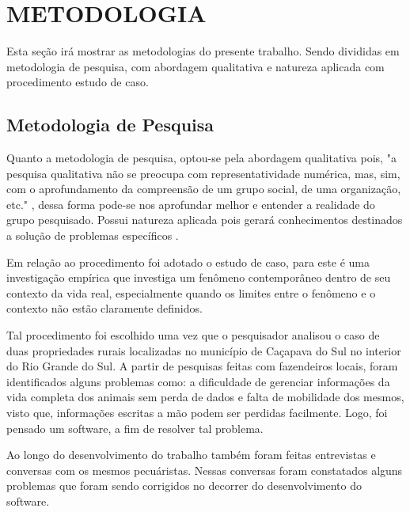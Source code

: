 %
%



\section{METODOLOGIA}\label{chap:metodologia}

Esta seção irá mostrar as metodologias do presente trabalho. Sendo divididas em metodologia de pesquisa, com abordagem qualitativa e natureza aplicada com procedimento estudo de caso.

\subsection{\textbf{Metodologia de Pesquisa}}

Quanto a metodologia de pesquisa, optou-se pela abordagem qualitativa pois, "a pesquisa qualitativa não se preocupa com representatividade numérica, mas, sim, com o aprofundamento da compreensão de um grupo social, de uma organização, etc."  \cite{ufrgs09}, dessa forma pode-se nos aprofundar melhor e entender a realidade do grupo pesquisado. Possui natureza aplicada pois gerará conhecimentos destinados a solução de problemas específicos \cite{ufrgs09} .

Em relação ao procedimento foi adotado o estudo de caso, para  este é uma investigação empírica que investiga um fenômeno contemporâneo dentro de seu contexto da vida real, especialmente quando os limites entre o fenômeno e o contexto não estão claramente definidos.

Tal procedimento foi  escolhido uma vez que o pesquisador analisou o caso de duas propriedades rurais localizadas no município de Caçapava do Sul no interior do Rio Grande do Sul. A partir de pesquisas  feitas com fazendeiros locais, foram identificados alguns problemas como: a dificuldade de gerenciar informações da vida completa dos animais sem perda de  dados e falta de mobilidade dos mesmos, visto que, informações escritas a mão podem ser perdidas facilmente. Logo, foi pensado um software, a fim de resolver tal problema.

Ao longo do desenvolvimento do trabalho também foram feitas entrevistas e conversas com os mesmos pecuáristas. Nessas conversas foram constatados alguns problemas que foram sendo corrigidos no decorrer do desenvolvimento do software.


